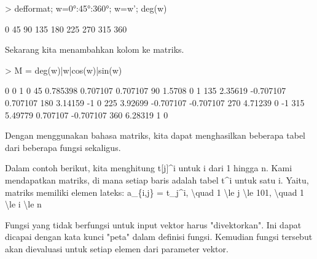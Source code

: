 \documentclass[a4paper,10pt]{article}
\begin{document}
\begin{eulernotebook}
\begin{eulercomment}
\begin{eulercomment}
\begin{eulercomment}
\begin{eulercomment}
\begin{eulercomment}
\begin{eulercomment}
\begin{eulerprompt}
> defformat; w=0°:45°:360°; w=w'; deg(w)
\end{eulerprompt}
\begin{euleroutput}
              0 
             45 
             90 
            135 
            180 
            225 
            270 
            315 
            360 
\end{euleroutput}
\begin{eulercomment}
Sekarang kita menambahkan kolom ke matriks.
\end{eulercomment}
\begin{eulerprompt}
> M = deg(w)|w|cos(w)|sin(w)
\end{eulerprompt}
\begin{euleroutput}
              0             0             1             0 
             45      0.785398      0.707107      0.707107 
             90        1.5708             0             1 
            135       2.35619     -0.707107      0.707107 
            180       3.14159            -1             0 
            225       3.92699     -0.707107     -0.707107 
            270       4.71239             0            -1 
            315       5.49779      0.707107     -0.707107 
            360       6.28319             1             0 
\end{euleroutput}
\begin{eulercomment}
Dengan menggunakan bahasa matriks, kita dapat menghasilkan beberapa
tabel dari beberapa fungsi sekaligus.

Dalam contoh berikut, kita menghitung t[j]\textasciicircum{}i untuk i dari 1 hingga n.
Kami mendapatkan matriks, di mana setiap baris adalah tabel t\textasciicircum{}i untuk
satu i. Yaitu, matriks memiliki elemen lateks: a\_\{i,j\} = t\_j\textasciicircum{}i, \textbackslash{}quad
1 \textbackslash{}le j \textbackslash{}le 101, \textbackslash{}quad 1 \textbackslash{}le i \textbackslash{}le n

Fungsi yang tidak berfungsi untuk input vektor harus "divektorkan".
Ini dapat dicapai dengan kata kunci "peta" dalam definisi fungsi.
Kemudian fungsi tersebut akan dievaluasi untuk setiap elemen dari
parameter vektor.


\end{eulercomment}
\end{eulercomment}
\end{eulercomment}
\end{eulercomment}
\end{eulercomment}
\end{eulercomment}
\end{eulercomment}
\end{eulernotebook}
\end{document}
